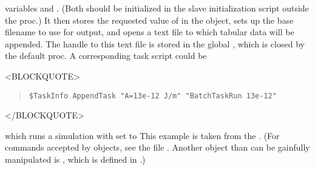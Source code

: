 variables  and .  (Both should be initialized in
the slave initialization script outside the  proc.)
It then stores the requested value of  in the
 object, sets up the base filename to use for
output, and opens a text file to which tabular
data will be appended.  The handle to this text
file is stored in the global , which is closed by the
default  proc.  A corresponding task script could
be
\begin{rawhtml}<BLOCKQUOTE>\end{rawhtml}
\begin{quote}
\begin{verbatim}
$TaskInfo AppendTask "A=13e-12 J/m" "BatchTaskRun 13e-12"
\end{verbatim}
\end{quote}
\begin{rawhtml}</BLOCKQUOTE>\end{rawhtml}
which runs a simulation with  set to
This example is taken from the 
.  (For
commands accepted by  objects, see the file .
Another object than can be gainfully manipulated is , which
is defined in .)

